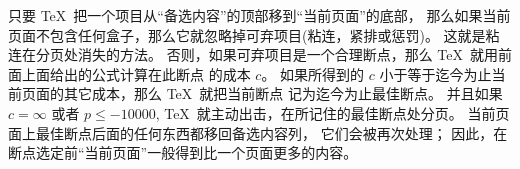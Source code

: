 \ddanger 只要 \TeX\ 把一个项目从``备选内容''的顶部移到``当前页面''的底部，
那么如果当前页面不包含任何盒子，那么它就忽略掉可弃项目(粘连，紧排或惩罚)。%
这就是粘连在分页处消失的方法。%
否则，如果可弃项目是一个合理断点，那么 \TeX\ 就用前面上面给出的公式计算在此断点%
的成本 $c$。%
如果所得到的 $c$ 小于等于迄今为止当前页面的其它成本，那么 \TeX\ 就把当前断点%
记为迄今为止最佳断点。%
并且如果 $c=\infty$ 或者 $p\le-10000$,  \TeX\ 就主动出击，在所记住的最佳断点处分页。%
当前页面上最佳断点后面的任何东西都移回备选内容列，
它们会被再次处理；
因此，在断点选定前``当前页面''一般得到比一个页面更多的内容。

